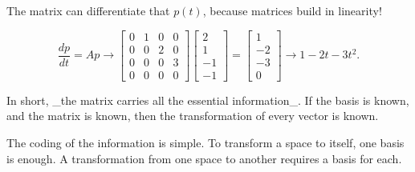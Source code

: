 The matrix can differentiate that \(p(t)\), because matrices build in linearity!

\[\frac{dp}{dt}=Ap\longrightarrow\begin{bmatrix}0&1&0&0\\ 0&0&2&0\\ 0&0&0&3\\ 0&0&0&0\end{bmatrix}\begin{bmatrix}2\\ 1\\ -1\\ -1\end{bmatrix}=\begin{bmatrix}1\\ -2\\ -3\\ 0\end{bmatrix}\longrightarrow 1-2t-3t^{2}.\]

In short, _the matrix carries all the essential information_. If the basis is known, and the matrix is known, then the transformation of every vector is known.

The coding of the information is simple. To transform a space to itself, one basis is enough. A transformation from one space to another requires a basis for each.

 